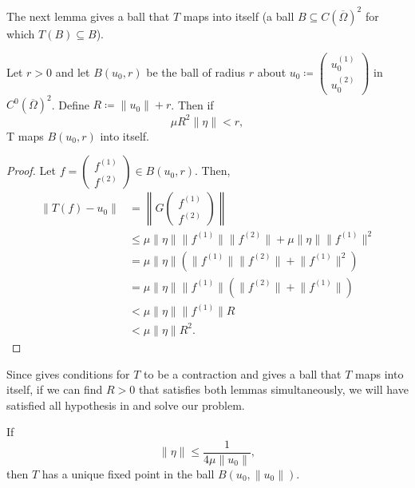\documentclass[a4paper, 12pt]{article}
\begin{document}
The next lemma gives a ball that $T$ maps into itself (a ball $B\subseteq C\left( \overline{\Omega} \right)^2$ for which $T\left( B \right) \subseteq B$).
\begin{lem}\label{lem:2}
	Let $r > 0$ and let $B\left( u_0,r \right)$ be the ball of radius $r$ about $u_0 \coloneqq \begin{pmatrix} u_0^{(1)}\\u_0^{(2)} \end{pmatrix} $ in $C^{0}\left( \overline{\Omega} \right)^2$.
	Define $R\coloneqq \lVert u_0 \rVert+ r$. Then if
	\[
	\mu R^2 \lVert \eta \rVert< r
	,\]
	T maps $B\left( u_0,r \right)$ into itself.
\end{lem}
\begin{proof}
	Let $f = \begin{pmatrix} f^{(1)}\\f^{(2)} \end{pmatrix} \in B\left( u_0,r \right)$.
	Then,
	\begin{align*}
\lVert T\left( f \right) -u_0 \rVert&= \left\lVert G\begin{pmatrix} f^{(1)}\\f^{(2)} \end{pmatrix}\right\rVert \\
	&\le \mu\lVert \eta \rVert \lVert f^{(1)} \rVert\lVert f^{(2)} \rVert+ \mu \lVert \eta \rVert \lVert f^{(1)} \rVert^2\\
	&= \mu \lVert \eta \rVert\left( \lVert f^{(1)} \rVert\lVert f^{(2)} \rVert+ \lVert f^{(1)} \rVert^2 \right) \\
	&= \mu \lVert \eta \rVert \lVert f^{(1)} \rVert\left( \lVert f^{(2)} \rVert+ \lVert f^{(1)} \rVert \right) \\
	&< \mu \lVert \eta \rVert \lVert f^{(1)} \rVert R \\
	&< \mu \lVert \eta \rVert R^2
	.\end{align*}
\end{proof}
Since  gives conditions for $T$ to be a contraction and   gives a ball that $T$ maps into itself,
if we can find $R > 0$ that satisfies both lemmas
simultaneously, we will have satisfied all hypothesis in  and solve our problem.
\begin{prop}\label{lastprop}
	If
	\begin{equation}
		\lVert \eta \rVert \le \frac{1}{4\mu\lVert u_0 \rVert}
	,\end{equation}
	then $T$ has a unique fixed point in the ball $B\left( u_0, \lVert u_0 \rVert \right)$.
\end{prop}
\end{document}
